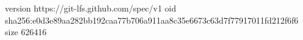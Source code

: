version https://git-lfs.github.com/spec/v1
oid sha256:e0d3e89aa282bb192caa77b706a911aa8c35e6673c63d7f77917011fd212f6f6
size 626416

